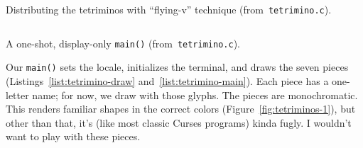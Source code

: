 \begin{listing}[!htbp]
\inputminted[]{C}{code/tetrimino-draw.h}
\caption{Distributing the tetriminos with ``flying-v'' technique (from~\texttt{tetrimino.c}).}
\label{list:tetrimino-draw}
\end{listing}

\begin{listing}[!htbp]
\inputminted[]{C}{code/tetrimino-main.h}
\caption{A one-shot, display-only \texttt{main()} (from~\texttt{tetrimino.c}).}
\label{list:tetrimino-main}
\end{listing}

Our \texttt{main()} sets the locale, initializes the terminal, and draws the
seven pieces (Listings~\ref{list:tetrimino-draw} and~\ref{list:tetrimino-main}).
Each piece has a one-letter name; for now, we draw with those glyphs. The
pieces are monochromatic. This renders familiar shapes in the correct colors
(Figure~\ref{fig:tetriminos-1}), but other than that, it's (like most classic
Curses programs) kinda fugly. I wouldn't want to play with these pieces.

